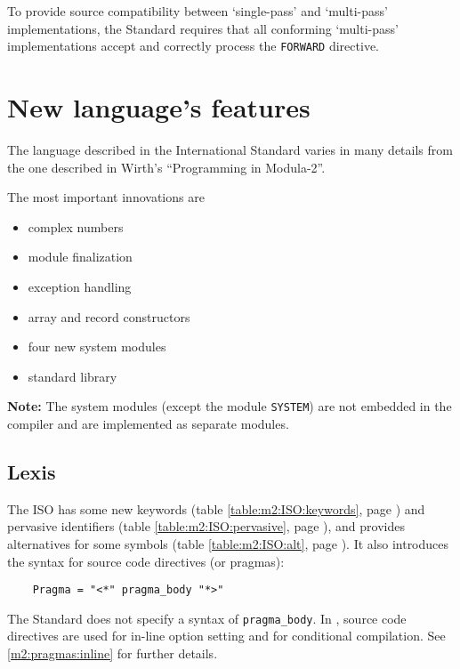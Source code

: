 To provide source compatibility between `single-pass' and
`multi-pass' implementations, the Standard requires that all
conforming `multi-pass' implementations accept and correctly
process the \verb'FORWARD' directive.

%

\section{New language's features}\label{m2:ISO:features}

The  language  described  in the International Standard varies in
many details from the one described in Wirth's ``Programming
in Modula-2''\ifonline\else\cite{PIM}\fi. %

The most important innovations are
\begin{itemize}
\item complex numbers
\item module finalization
\item exception handling
\item array and record constructors
\item four new system modules
\item standard library
\end{itemize}

{\bf Note:}  The system modules (except the module {\tt SYSTEM})
are not embedded in the compiler and are implemented as separate
modules.

\subsection{Lexis}

The ISO \mt{} has some new keywords
\ifonline\else (table \ref{table:m2:ISO:keywords},
page \pageref{table:m2:ISO:keywords})\fi{}
and pervasive identifiers
\ifonline\else (table \ref{table:m2:ISO:pervasive},
page \pageref{table:m2:ISO:pervasive})\fi,
and provides alternatives for some symbols
\ifonline\else(table \ref{table:m2:ISO:alt},
page \pageref{table:m2:ISO:alt})\fi.
It also introduces the syntax for source code directives (or pragmas):

\verb'    Pragma = "<*" pragma_body "*>"'

The Standard does not specify a syntax of \verb|pragma_body|.
In \XDS{}, source code directives are used for in-line option setting
and for conditional compilation.
See \ref{m2:pragmas:inline} for further details.

